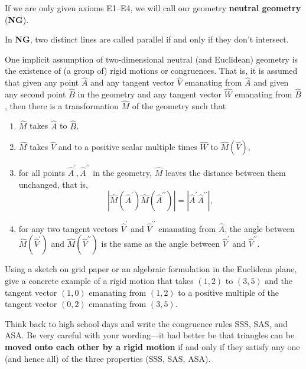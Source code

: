 \begin{definition}
If we are only given axioms E1--E4, we will call our
geometry \textbf{neutral geometry} (\textbf{NG}).
\end{definition}

\begin{definition}
In \textbf{NG}, two distinct lines are called parallel if and only if they
don't intersect.
\end{definition}

One implicit assumption of two-dimensional neutral (and Euclidean)
geometry is the existence of (a group of) rigid motions or
congruences. That is, it is assumed that given any point $\hat{A}$ and
any tangent vector $\hat{V}$ emanating from $\hat{A}$ and given any
second point $\hat{B}$ in the geometry and any tangent vector
$\hat{W}$ emanating from $\hat{B}$, then there is a transformation
$\hat{M}$ of the geometry such that
\begin{enumerate}
\item $\hat{M}$ takes $\hat{A}$ to $\hat{B}$,
\item $\hat{M}$ takes $\hat{V}$ and to a positive scalar multiple times $\hat{W}$ to $\hat{M}\left( \hat{V}\right) $,
\item for all points $\hat{A}^{\prime},\hat{A}^{\prime\prime}$ in the
geometry, $\hat{M}$ leaves the distance between them unchanged, that
is,
\[
\left\vert \hat{M}\left(  \hat{A}^{\prime}\right)  \hat{M}\left(  \hat
{A}^{\prime\prime}\right) \right\vert =\left\vert \hat{A}^{\prime}\hat
{A}^{\prime\prime}\right\vert ,
\]
\item for any two tangent vectors $\hat{V}^{\prime}$ and
$\hat{V}^{\prime\prime}$ emanating from $\hat{A}$, the angle between
$\hat{M}\left( \hat{V}^{\prime }\right) $ and
$\hat{M}\left( \hat{V}^{\prime\prime}\right) $ is the same as the
angle between $\hat{V}^{\prime}$ and $\hat{V}^{\prime\prime}$.
\end{enumerate}


\begin{exercise}
Using a sketch on grid paper or an algebraic formulation in the
Euclidean plane, give a concrete example of a rigid motion that takes
$\left( 1,2\right) $ to $\left( 3,5\right) $ and the tangent vector
$\left( 1,0\right) $ emanating from $\left( 1,2\right) $ to a positive
multiple of the tangent vector $\left( 0,2\right) $ emanating from
$\left( 3,5\right)$.
\end{exercise}

\begin{exploration}
Think back to high school days and write the congruence rules SSS,
SAS, and ASA. Be very careful with your wording---it had better be
that triangles can be \textbf{moved onto each other by a rigid motion}
if and only if they satisfy any one (and hence all) of the three
properties (SSS, SAS, ASA).
\end{exploration}

